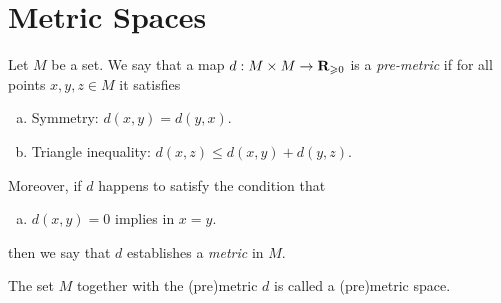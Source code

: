 \section{Metric Spaces}


\begin{definition}
\label{def:premetric-and-metric-space}
Let \(M\) be a set. We say that a map \(d: M \times M \to \mathbf{R}_{\geqslant 0}\) is a
\emph{pre-metric} if for all points \(x, y, z \in M\) it satisfies
\begin{enumerate}[(a)]\setlength\itemsep{0em}
\item Symmetry: \(d(x, y) = d(y, x)\).
\item Triangle inequality: \(d(x, z) \leq d(x, y) + d(y, z)\).
\end{enumerate}
Moreover, if \(d\) happens to satisfy the condition that
\begin{enumerate}[(a)]\setlength\itemsep{0em}\setcounter{enumi}{2}
\item \(d(x, y) = 0\) implies in \(x = y\).
\end{enumerate}
then we say that \(d\) establishes a \emph{metric} in \(M\).

The set \(M\) together with the (pre)metric \(d\) is called a (pre)metric space.
\end{definition}

